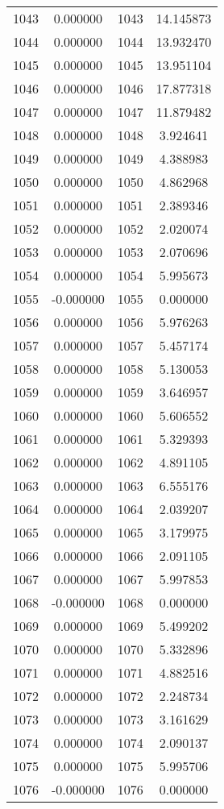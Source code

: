 \documentclass[12pt]{article}
\begin{document}
\begin{longtable}{@{}cccc@{}}
1043 & 0.000000 & 1043 & 14.145873 \\
1044 & 0.000000 & 1044 & 13.932470 \\
1045 & 0.000000 & 1045 & 13.951104 \\
1046 & 0.000000 & 1046 & 17.877318 \\
1047 & 0.000000 & 1047 & 11.879482 \\
1048 & 0.000000 & 1048 & 3.924641 \\
1049 & 0.000000 & 1049 & 4.388983 \\
1050 & 0.000000 & 1050 & 4.862968 \\
1051 & 0.000000 & 1051 & 2.389346 \\
1052 & 0.000000 & 1052 & 2.020074 \\
1053 & 0.000000 & 1053 & 2.070696 \\
1054 & 0.000000 & 1054 & 5.995673 \\
1055 & -0.000000 & 1055 & 0.000000 \\
1056 & 0.000000 & 1056 & 5.976263 \\
1057 & 0.000000 & 1057 & 5.457174 \\
1058 & 0.000000 & 1058 & 5.130053 \\
1059 & 0.000000 & 1059 & 3.646957 \\
1060 & 0.000000 & 1060 & 5.606552 \\
1061 & 0.000000 & 1061 & 5.329393 \\
1062 & 0.000000 & 1062 & 4.891105 \\
1063 & 0.000000 & 1063 & 6.555176 \\
1064 & 0.000000 & 1064 & 2.039207 \\
1065 & 0.000000 & 1065 & 3.179975 \\
1066 & 0.000000 & 1066 & 2.091105 \\
1067 & 0.000000 & 1067 & 5.997853 \\
1068 & -0.000000 & 1068 & 0.000000 \\
1069 & 0.000000 & 1069 & 5.499202 \\
1070 & 0.000000 & 1070 & 5.332896 \\
1071 & 0.000000 & 1071 & 4.882516 \\
1072 & 0.000000 & 1072 & 2.248734 \\
1073 & 0.000000 & 1073 & 3.161629 \\
1074 & 0.000000 & 1074 & 2.090137 \\
1075 & 0.000000 & 1075 & 5.995706 \\
1076 & -0.000000 & 1076 & 0.000000 \\

\end{longtable}
\end{document}
